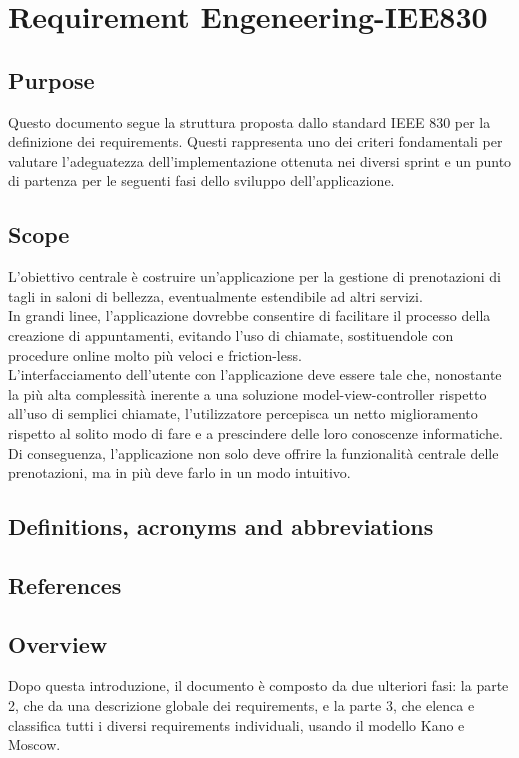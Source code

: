 \documentclass{article}
\begin{document}
\newpage
\section{Requirement Engeneering-IEE830}
\subsection{Purpose} 
Questo documento segue la struttura proposta dallo standard IEEE 830 per la definizione dei requirements. Questi rappresenta uno dei criteri fondamentali per valutare l’adeguatezza dell’implementazione ottenuta nei diversi sprint e un punto di partenza per le seguenti fasi dello sviluppo dell’applicazione.
\subsection{Scope}
L’obiettivo centrale è costruire un’applicazione per la gestione di prenotazioni di tagli in saloni di bellezza, eventualmente estendibile ad altri servizi. 
\\In grandi linee, l’applicazione dovrebbe consentire di facilitare il processo della creazione di appuntamenti, evitando l’uso di chiamate, sostituendole con procedure online molto più veloci e friction-less. 
\\L’interfacciamento dell’utente con l’applicazione deve essere tale che, nonostante la più alta complessità inerente a una soluzione model-view-controller rispetto all’uso di semplici chiamate, l’utilizzatore percepisca un netto miglioramento rispetto al solito modo di fare e a prescindere delle loro conoscenze informatiche. 
\\Di conseguenza, l’applicazione non solo deve offrire la funzionalità centrale delle prenotazioni, ma in più deve farlo in un modo intuitivo. 

\subsection {Definitions, acronyms and abbreviations }
\subsection {References} 
\subsection {Overview} 
Dopo questa introduzione, il documento è composto da due ulteriori fasi: la parte 2, che da una descrizione globale dei requirements, e la parte 3, che elenca e classifica tutti i diversi requirements individuali, usando il modello Kano e Moscow.
\end{document}

